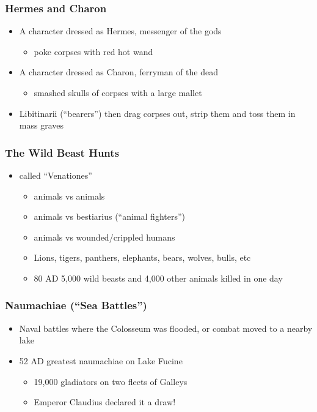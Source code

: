 \documentclass[12pt, twoside]{article}
\begin{document}
\subsubsection{Hermes and Charon}
\begin{itemize}
\item A character dressed as Hermes, messenger of the gods
	\begin{itemize}
	\item poke corpses with red hot wand
	\end{itemize}
\item A character dressed as Charon, ferryman of the dead
	\begin{itemize}
	\item smashed skulls of corpses with a large mallet
	\end{itemize}
\item Libitinarii (“bearers”) then drag corpses out, strip them and toss them in mass graves
\end{itemize}

\subsubsection{The Wild Beast Hunts}
\begin{itemize}
\item called “Venationes”
	\begin{itemize}
	\item animals vs animals
	\item animals vs bestiarius (“animal fighters”)
	\item animals vs wounded/crippled humans
	\item Lions, tigers, panthers, elephants, bears, wolves, bulls, etc
	\item 80 AD 5,000 wild beasts and 4,000 other animals killed in one day
	\end{itemize}
\end{itemize}

\subsubsection{Naumachiae (“Sea Battles”)}
\begin{itemize}
\item Naval battles where the Colosseum was flooded, or combat moved to a nearby lake
\item 52 AD greatest naumachiae on Lake Fucine
	\begin{itemize}
	\item 19,000 gladiators on two fleets of Galleys
	\item Emperor Claudius declared it a draw!
	\end{itemize}
\end{itemize}
\end{document}
